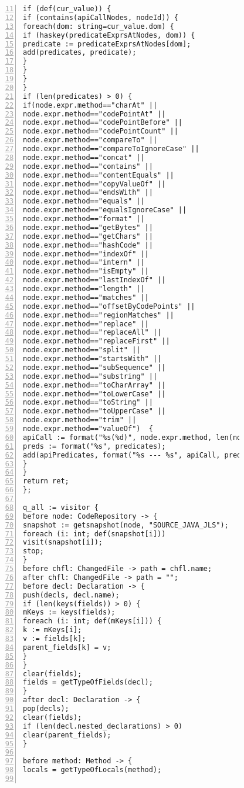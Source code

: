 \begin{figure}[ht!]
\begin{lstlisting}[numbers=left, tabsize=4, escapechar=@, caption={API Precondition Mining Analysis},label={lst:apm-code}, firstline = 11, firstnumber = 11, lastline = 59]
if (def(cur_value)) {
if (contains(apiCallNodes, nodeId)) {
foreach(dom: string=cur_value.dom) {
if (haskey(predicateExprsAtNodes, dom)) {
predicate := predicateExprsAtNodes[dom];
add(predicates, predicate);
}
}
}
}
if (len(predicates) > 0) {
if(node.expr.method=="charAt" ||  
node.expr.method=="codePointAt" || 
node.expr.method=="codePointBefore" || 
node.expr.method=="codePointCount" || 
node.expr.method=="compareTo" || 
node.expr.method=="compareToIgnoreCase" || 
node.expr.method=="concat" || 
node.expr.method=="contains" || 
node.expr.method=="contentEquals" || 
node.expr.method=="copyValueOf" || 
node.expr.method=="endsWith" || 
node.expr.method=="equals" || 
node.expr.method=="equalsIgnoreCase" || 
node.expr.method=="format" || 
node.expr.method=="getBytes" || 
node.expr.method=="getChars" || 
node.expr.method=="hashCode" || 
node.expr.method=="indexOf" || 
node.expr.method=="intern" || 
node.expr.method=="isEmpty" || 
node.expr.method=="lastIndexOf" || 
node.expr.method=="length" || 
node.expr.method=="matches" || 
node.expr.method=="offsetByCodePoints" || 
node.expr.method=="regionMatches" || 
node.expr.method=="replace" || 
node.expr.method=="replaceAll" || 
node.expr.method=="replaceFirst" || 
node.expr.method=="split" ||  
node.expr.method=="startsWith" ||  
node.expr.method=="subSequence" || 
node.expr.method=="substring" || 
node.expr.method=="toCharArray" || 
node.expr.method=="toLowerCase" || 
node.expr.method=="toString" || 
node.expr.method=="toUpperCase" || 
node.expr.method=="trim" || 
node.expr.method=="valueOf")  {
apiCall := format("%s(%d)", node.expr.method, len(node.expr.method_args));
preds := format("%s", predicates);
add(apiPredicates, format("%s --- %s", apiCall, preds));
}
}
return ret;
};

q_all := visitor {
before node: CodeRepository -> {
snapshot := getsnapshot(node, "SOURCE_JAVA_JLS");
foreach (i: int; def(snapshot[i]))
visit(snapshot[i]);
stop;
}
before chfl: ChangedFile -> path = chfl.name;
after chfl: ChangedFile -> path = "";
before decl: Declaration -> {
push(decls, decl.name);
if (len(keys(fields)) > 0) {
mKeys := keys(fields);    
foreach (i: int; def(mKeys[i])) {
k := mKeys[i];
v := fields[k];
parent_fields[k] = v;
}
}
clear(fields);
fields = getTypeOfFields(decl);
}
after decl: Declaration -> {
pop(decls);
clear(fields);
if (len(decl.nested_declarations) > 0)
clear(parent_fields);
}

before method: Method -> {
locals = getTypeOfLocals(method);


\end{lstlisting}
\end{figure}
